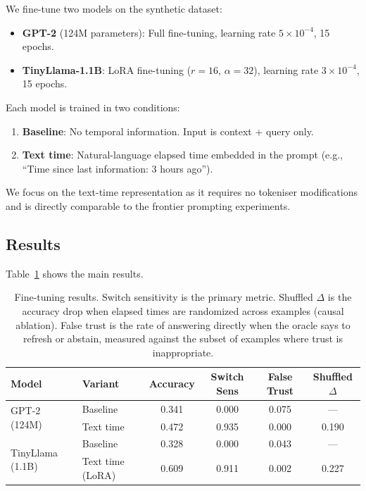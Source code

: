 \documentclass[11pt,a4paper]{article}
\begin{document}
We fine-tune two models on the synthetic dataset:
\begin{itemize}
    \item \textbf{GPT-2} (124M parameters): Full fine-tuning, learning rate $5 \times 10^{-4}$, 15 epochs.
    \item \textbf{TinyLlama-1.1B}: LoRA fine-tuning ($r=16$, $\alpha=32$), learning rate $3 \times 10^{-4}$, 15 epochs.
\end{itemize}

Each model is trained in two conditions:
\begin{enumerate}
    \item \textbf{Baseline}: No temporal information. Input is context + query only.
    \item \textbf{Text time}: Natural-language elapsed time embedded in the prompt (e.g., ``Time since last information: 3 hours ago'').
\end{enumerate}

We focus on the text-time representation as it requires no tokeniser modifications and is directly comparable to the frontier prompting experiments.

\subsection{Results}

Table~\ref{tab:finetune} shows the main results.

\begin{table}[h]
\centering
\caption{Fine-tuning results. Switch sensitivity is the primary metric. Shuffled $\Delta$ is the accuracy drop when elapsed times are randomized across examples (causal ablation). False trust is the rate of answering directly when the oracle says to refresh or abstain, measured against the subset of examples where trust is inappropriate.}
\label{tab:finetune}
\begin{tabular}{llcccc}
\toprule
\textbf{Model} & \textbf{Variant} & \textbf{Accuracy} & \textbf{Switch Sens} & \textbf{False Trust} & \textbf{Shuffled $\Delta$} \\
\midrule
\multirow{2}{*}{GPT-2 (124M)}
  & Baseline     & 0.341 & 0.000 & 0.075 & --- \\
  & Text time    & 0.472 & 0.935 & 0.000 & 0.190 \\
\midrule
\multirow{2}{*}{TinyLlama (1.1B)}
  & Baseline         & 0.328 & 0.000 & 0.043 & --- \\
  & Text time (LoRA) & 0.609 & 0.911 & 0.002 & 0.227 \\
\bottomrule
\end{tabular}
\end{table}
\end{document}
